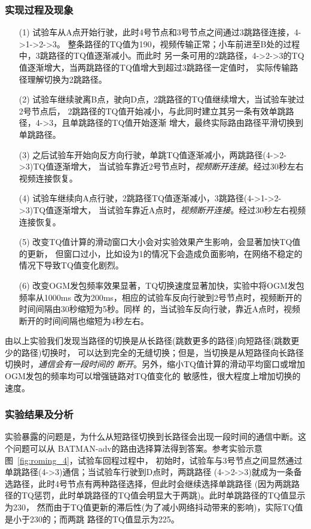 \subsubsection{实现过程及现象}
\begin{itemize}
\item[(1)] 试验车从A点开始行驶，此时4号节点和3号节点之间通过3跳路径连接，4->1->2->3。
整条路径的TQ值为190，视频传输正常；小车前进至B处的过程中，3跳路径的TQ值逐渐减小。而此时
另一条可用的2跳路径，4->2->3的TQ值逐渐增大，当两跳路径的TQ值增大到超过3跳路径一定值时，
实际传输路径理解切换为2跳路径。
\item[(2)] 试验车继续驶离B点，驶向D点，2跳路径的TQ值继续增大，当试验车驶过2号节点后，
2跳路径的TQ值开始减小，与此同时建立其另一条有效单跳路径，4->3，且单跳路径的TQ值开始逐渐
增大，最终实际路由路径平滑切换到单跳路径。
\item[(3)] 之后试验车开始向反方向行驶，单跳TQ值逐渐减小，两跳路径(4->2->3)TQ值逐渐增大，
当试验车靠近2号节点时，\emph{视频断开连接}。经过30秒左右视频连接恢复。
\item[(4)] 试验车继续向A点行驶，2跳路径TQ值逐渐减小，3跳路径(4->1->2->3)TQ值逐渐增大，
当试验车靠近A点时，\emph{视频断开连接}。经过30秒左右视频连接恢复。
\item[(5)] 改变TQ值计算的滑动窗口大小会对实验效果产生影响，会显著加快TQ值的更新，
但窗口过小，比如设为1的情况下会造成负面影响，在网络不稳定的情况下导致TQ值变化剧烈。
\item[(6)] 改变OGM发包频率效果显著，TQ切换速度显著加快，实验中将OGM发包频率从1000ms
改为200ms，相应的试验车反向行驶到2号节点时，视频断开的时间间隔由30秒缩短为5秒。同样
的，当试验车反向行驶，靠近A点时，视频断开的时间间隔也缩短为4秒左右。
\end{itemize}
由以上实验我们发现当路径的切换是从长路径(跳数更多的路径)向短路径(跳数更少的路径)切换时，
可以达到完全的无缝切换；但是，当切换是从短路径向长路径切换时，\emph{通信会有一段时间的
断开}。另外，缩小TQ值计算的滑动平均窗口或增加OGM发包的频率均可以增强链路对TQ值变化的
敏感性，很大程度上增加切换的速度。

\subsubsection{实验结果及分析}
实验暴露的问题是，为什么从短路径切换到长路径会出现一段时间的通信中断。这个问题可以从
BATMAN-adv的路由选择算法得到答案。参考实验示意图~\ref{fig:roming_4}，试验车回程过程中，
初始时，试验车与3号节点之间显然通过单跳路径(4->3)通信；当试验车行驶到D点时，两跳路径
(4->2->3)就成为一条备选路径，此时4号节点有两种路径选择，但此时会继续选择单跳路径
(因为两跳路径的TQ惩罚，此时单跳路径的TQ值会明显大于两跳)。此时单跳路径的TQ值显示为230，
然而由于TQ值更新的滞后性(为了减小网络抖动带来的影响)，实际TQ值是小于230的；而两跳
路径的TQ值显示为225。

